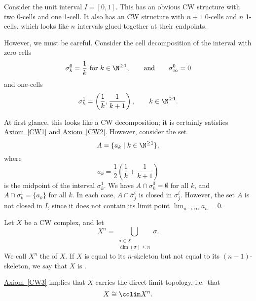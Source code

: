 \documentclass[main.tex]{subfiles}
\begin{document}
\begin{example}
  Consider the unit interval $I = [0, 1]$. This has an obvious CW structure with two 0-cells and one 1-cell. It also has an CW structure with $n+1$ 0-cells and $n$ 1-cells. which looks like $n$ intervals glued together at their endpoints.

  However, we must be careful. Consider the cell decomposition of the interval with zero-cells
  \begin{equation*}
    \sigma^{0}_{k} = \frac{1}{k}\text{ for } k \in \N^{\geq 1},\qquad \text{and}\qquad \sigma^{0}_{\infty} = 0
  \end{equation*}
  and one-cells
  \begin{equation*}
    \sigma^{1}_{k} = \left( \frac{1}{k}, \frac{1}{k+1} \right),\qquad k \in \N^{\geq 1}.
  \end{equation*}

  At first glance, this looks like a CW decomposition; it is certainly satisfies \hyperref[CW1]{Axiom~\ref*{CW1}} and \hyperref[CW2]{Axiom~\ref*{CW2}}. However, consider the set
  \begin{equation*}
    A = \{a_{k}\mid k \in \N^{\geq 1} \},
  \end{equation*}
  where
  \begin{equation*}
    a_{k} = \frac{1}{2}\left( \frac{1}{k} + \frac{1}{k+1} \right)
  \end{equation*}
  is the midpoint of the interval $\sigma^{1}_{k}$. We have $A \cap \sigma^{0}_{k} = \emptyset$ for all $k$, and $A \cap \sigma^{1}_{k} = \{a_{k}\}$ for all $k$. In each case, $A \cap \bar{\sigma}^{i}_{j}$ is closed in $\sigma^{i}_{j}$. However, the set $A$ is not closed in $I$, since it does not contain its limit point $\lim_{n \to \infty} a_{n} = 0$.
\end{example}

\begin{definition}
  \label{def:skeleton}
  Let $X$ be a CW complex, and let
  \begin{equation*}
    X^{n} = \bigcup_{\substack{\sigma \in X \\ \dim(\sigma) \leq n}} \sigma.
  \end{equation*}
  We call $X^{n}$ the  of $X$. If $X$ is equal to its $n$-skeleton but not equal to its $(n-1)$-skeleton, we say that $X$ is .
\end{definition}

\begin{note}
  \hyperref[CW3]{Axiom~\ref*{CW3}} implies that $X$ carries the direct limit topology, i.e.\ that
  \begin{equation*}
    X \cong \colim X^{n}.
  \end{equation*}
\end{note}
\end{document}
